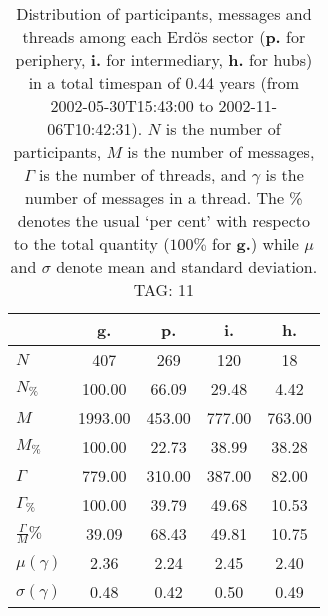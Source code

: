 \begin{table}[h!]
\begin{center}
\begin{tabular}{| l || c | c | c | c |}\hline
 & {\bf g.} & {\bf p.} & {\bf i.} & {\bf h.} \\\hline\hline
$N$ & 407  & 269  & 120  & 18 \\
$N_{\%}$ & 100.00  & 66.09  & 29.48  & 4.42 \\\hline
$M$ & 1993.00  & 453.00  & 777.00  & 763.00 \\
$M_{\%}$ & 100.00  & 22.73  & 38.99  & 38.28 \\\hline
$\Gamma$ & 779.00  & 310.00  & 387.00  & 82.00 \\
$\Gamma_{\%}$ & 100.00  & 39.79  & 49.68  & 10.53 \\\hline
$\frac{\Gamma}{M}\%$ & 39.09  & 68.43  & 49.81  & 10.75 \\
$\mu(\gamma)$ & 2.36  & 2.24  & 2.45  & 2.40 \\
$\sigma(\gamma)$ & 0.48  & 0.42  & 0.50  & 0.49 \\\hline
\end{tabular}
\caption{Distribution of participants, messages and threads among each Erd\"os sector ({\bf p.} for periphery, {\bf i.} for intermediary, 
    {\bf h.} for hubs) in a total timespan of 0.44 years (from 2002-05-30T15:43:00 to 2002-11-06T10:42:31). $N$ is the number of participants, $M$ is the number of messages, $\Gamma$ is the number of threads, and $\gamma$ is the number of messages in a thread.
    The \% denotes the usual `per cent' with respecto to the total quantity ($100\%$ for {\bf g.})
    while $\mu$ and $\sigma$ denote mean and standard deviation. TAG: 11}
\end{center}
\end{table}